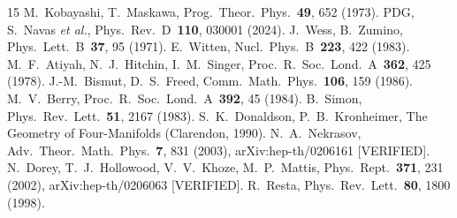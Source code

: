 \documentclass[5p,times,twocolumn]{elsarticle}
\begin{document}
\begin{thebibliography}{15}
M.~Kobayashi, T.~Maskawa, Prog.~Theor.~Phys.~\textbf{49}, 652 (1973).
PDG, S.~Navas \emph{et al.}, Phys.~Rev.~D~\textbf{110}, 030001 (2024).
J.~Wess, B.~Zumino, Phys.~Lett.~B~\textbf{37}, 95 (1971).
E.~Witten, Nucl.~Phys.~B~\textbf{223}, 422 (1983).
M.~F.~Atiyah, N.~J.~Hitchin, I.~M.~Singer, Proc.~R.~Soc.~Lond.~A~\textbf{362}, 425 (1978).
J.-M.~Bismut, D.~S.~Freed, Comm.~Math.~Phys.~\textbf{106}, 159 (1986).
M.~V.~Berry, Proc.~R.~Soc.~Lond.~A~\textbf{392}, 45 (1984).
B.~Simon, Phys.~Rev.~Lett.~\textbf{51}, 2167 (1983).
S.~K.~Donaldson, P.~B.~Kronheimer, The Geometry of Four-Manifolds (Clarendon, 1990).
N.~A.~Nekrasov, Adv.~Theor.~Math.~Phys.~\textbf{7}, 831 (2003), arXiv:hep-th/0206161 [VERIFIED].
N.~Dorey, T.~J.~Hollowood, V.~V.~Khoze, M.~P.~Mattis, Phys.~Rept.~\textbf{371}, 231 (2002), arXiv:hep-th/0206063 [VERIFIED].
R.~Resta, Phys.~Rev.~Lett.~\textbf{80}, 1800 (1998).
\end{thebibliography}
\end{document}
